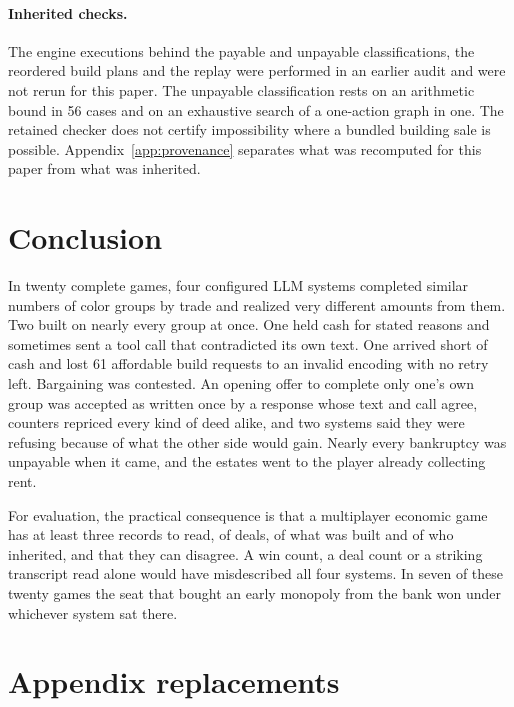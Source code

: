 \paragraph{Inherited checks.} The engine executions behind the payable and unpayable classifications, the reordered build plans and the replay were performed in an earlier audit and were not rerun for this paper. The unpayable classification rests on an arithmetic bound in 56 cases and on an exhaustive search of a one-action graph in one. The retained checker does not certify impossibility where a bundled building sale is possible. Appendix~\ref{app:provenance} separates what was recomputed for this paper from what was inherited.

\section{Conclusion}

In twenty complete games, four configured LLM systems completed similar numbers of color groups by trade and realized very different amounts from them. Two built on nearly every group at once. One held cash for stated reasons and sometimes sent a tool call that contradicted its own text. One arrived short of cash and lost 61 affordable build requests to an invalid encoding with no retry left. Bargaining was contested. An opening offer to complete only one's own group was accepted as written once by a response whose text and call agree, counters repriced every kind of deed alike, and two systems said they were refusing because of what the other side would gain. Nearly every bankruptcy was unpayable when it came, and the estates went to the player already collecting rent.

For evaluation, the practical consequence is that a multiplayer economic game has at least three records to read, of deals, of what was built and of who inherited, and that they can disagree. A win count, a deal count or a striking transcript read alone would have misdescribed all four systems. In seven of these twenty games the seat that bought an early monopoly from the bank won under whichever system sat there.

\section{Appendix replacements}

